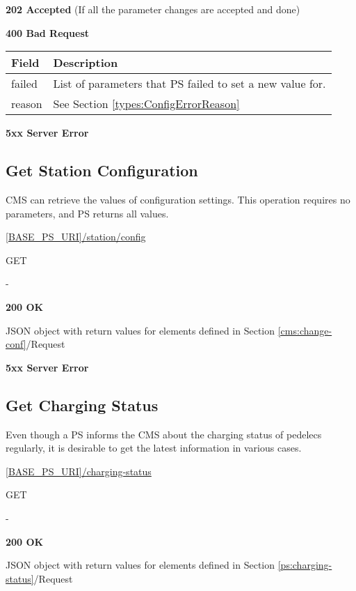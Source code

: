 \textbf{202 Accepted} (If all the parameter changes are accepted and done)

 \textbf{400 Bad Request}

\begin{tabularx}{\linewidth}{ | l | X | }
  \hline
  \rowcolor{table-head}
  Field & Description \\
  \hline
  failed		& List of parameters that \acs{PS} failed to set a new value for.\\
  reason 	& See Section \ref{types:ConfigErrorReason} \\
  \hline
\end{tabularx}

\textbf{5xx Server Error}

\subsection{Get Station Configuration}

\acs{CMS} can retrieve the values of configuration settings. This operation requires no parameters, and \acs{PS} returns all values.

 \url{[BASE_PS_URI]/station/config}

 GET

 -

 \textbf{200 OK}

JSON object with return values for elements defined in Section \ref{cms:change-conf}/Request

 \textbf{5xx Server Error}

\subsection{Get Charging Status}

Even though a \acs{PS} informs the \acs{CMS} about the charging status of pedelecs regularly, it is desirable to get the latest information in various cases.

 \url{[BASE_PS_URI]/charging-status}

 GET

 -

 \textbf{200 OK}

JSON object with return values for elements defined in Section \ref{ps:charging-status}/Request

